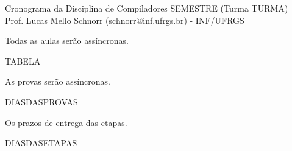 \documentclass[11pt,portuguese,]{article}
\begin{document}
\begin{center}
  {\LARGE Cronograma da Disciplina de Compiladores SEMESTRE (Turma TURMA)} \\
  Prof. Lucas Mello Schnorr (schnorr@inf.ufrgs.br) - INF/UFRGS
\end{center}

\begin{center}
  Todas as aulas serão assíncronas.
\end{center}

TABELA


\begin{center}
  As provas serão assíncronas.
\end{center}

DIASDASPROVAS

\begin{center}
  Os prazos de entrega das etapas.
\end{center}

DIASDASETAPAS
\end{document}

